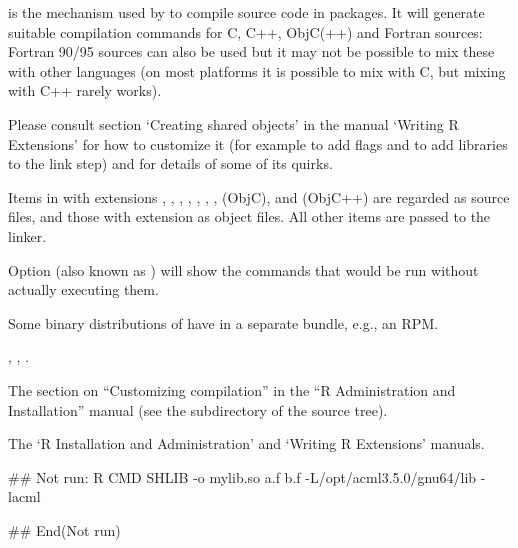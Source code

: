 %
\begin{Details}\relax
{} is the mechanism used by  to
compile source code in packages.  It will generate suitable
compilation commands for C, C++, ObjC(++) and Fortran sources: Fortran
90/95 sources can also be used but it may not be possible to mix these
with other languages (on most platforms it is possible to mix with C,
but mixing with C++ rarely works).

Please consult section `Creating shared objects' in the manual
`Writing R Extensions' for how to customize it (for example to
add  flags and to add libraries to the link step) and for
details of some of its quirks.

Items in  with extensions , ,
, , , , , 
(ObjC),  and  (ObjC++) are regarded as source
files, and those with extension  as object files.  All other
items are passed to the linker.

Option  (also known as ) will show the
commands that would be run without actually executing them.
\end{Details}
%
\begin{Note}\relax
Some binary distributions of \R{} have  in a separate
bundle, e.g., an  RPM.
\end{Note}
%
\begin{SeeAlso}\relax
{},
,
.

The section on ``Customizing compilation'' in the ``R
Administration and Installation'' manual (see the 
subdirectory of the \R{} source tree).

The `R Installation and Administration' and `Writing R 
Extensions' manuals.
\end{SeeAlso}
%
\begin{Examples}
\begin{ExampleCode}
## Not run: 
R CMD SHLIB -o mylib.so a.f b.f -L/opt/acml3.5.0/gnu64/lib -lacml

## End(Not run)
\end{ExampleCode}
\end{Examples}
